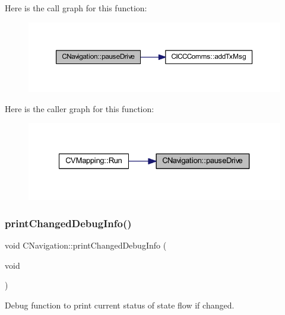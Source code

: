Here is the call graph for this function\+:\nopagebreak
\begin{figure}[H]
\begin{center}
\leavevmode
\includegraphics[width=350pt]{class_c_navigation_a27649dc6324360829d42aea67e88e3ee_cgraph}
\end{center}
\end{figure}
Here is the caller graph for this function\+:\nopagebreak
\begin{figure}[H]
\begin{center}
\leavevmode
\includegraphics[width=327pt]{class_c_navigation_a27649dc6324360829d42aea67e88e3ee_icgraph}
\end{center}
\end{figure}
\mbox{\label{class_c_navigation_ac491c77788ba2e953a704b6ad622a665}} 
\subsubsection{\texorpdfstring{printChangedDebugInfo()}{printChangedDebugInfo()}}
{\footnotesize\ttfamily void C\+Navigation\+::print\+Changed\+Debug\+Info (\begin{DoxyParamCaption}\item[{void}]{ }\end{DoxyParamCaption})\hspace{0.3cm}{\ttfamily [virtual]}}



Debug function to print current status of state flow if changed. 



